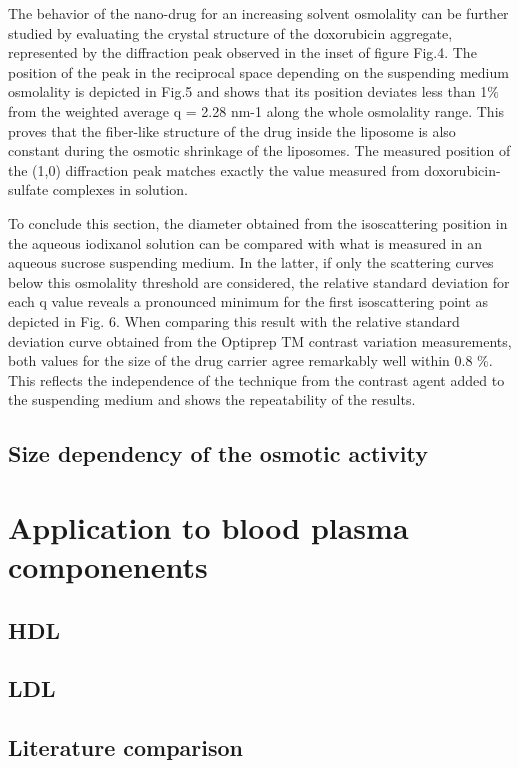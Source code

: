 The behavior of the nano-drug for an increasing solvent osmolality can be further studied by evaluating the crystal structure of the doxorubicin aggregate, represented by the diffraction peak observed in the inset of figure Fig.4. The position of the peak in the reciprocal space depending on the suspending medium osmolality is depicted in Fig.5 and shows that its position deviates less than 1$\%$ from the weighted average q = 2.28 nm-1 along the whole osmolality range. This proves that the fiber-like structure of the drug inside the liposome is also constant during the osmotic shrinkage of the liposomes. The measured position of the (1,0) diffraction peak matches exactly the value measured from doxorubicin-sulfate complexes in solution.


To conclude this section, the diameter obtained from the isoscattering position in the aqueous iodixanol solution can be compared with what is measured in an aqueous sucrose suspending medium.  In the latter, if only the scattering curves below this osmolality threshold are considered, the relative standard deviation for each q value reveals a pronounced minimum for the first isoscattering point as depicted in Fig. 6. When comparing this result with the relative standard deviation curve obtained from the Optiprep TM contrast variation measurements, both values for the size of the drug carrier agree remarkably well within 0.8 $\%$. This reflects the independence of the technique from the contrast agent added to the suspending medium and shows the repeatability of the results.

\subsection{Size dependency of the osmotic activity}

\section{Application to blood plasma componenents}
\subsection{HDL}
\subsection{LDL}
\subsection{Literature comparison}

